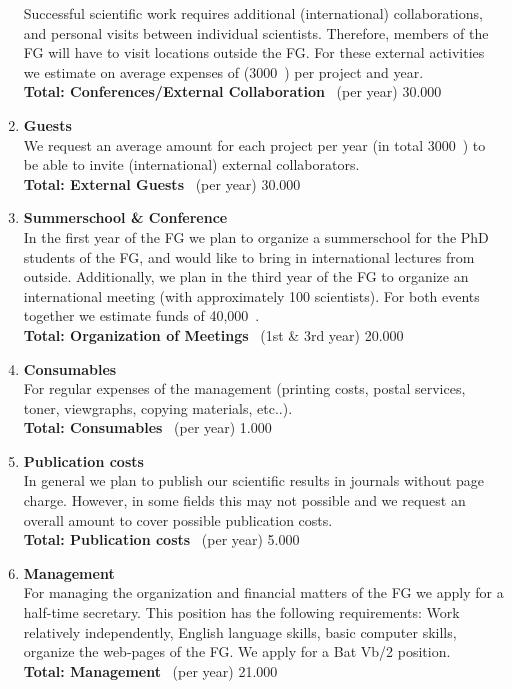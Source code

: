 \begin{enumerate}
Successful scientific work requires additional (international) collaborations, and
personal visits between individual scientists.
Therefore, members of the FG will have to visit locations outside the FG. 
For these external activities we estimate on average expenses of (3000~\EUR)
per project and year.
\\[0.2cm]
 {\bf Total: Conferences/External Collaboration} \, (per year)    \hfill 30.000~\EUR
\\[0.2cm]
%
\item {\bf Guests}\\
We request an average amount for each project per year (in total 3000~\EUR) to
be able to invite (international) external collaborators.
\\[0.2cm]
 {\bf Total: External Guests} \,  (per year)              \hfill 30.000~\EUR
\\[0.2cm]
%
%
\item {\bf Summerschool \& Conference}\\
In the first year of the FG we plan to organize a summerschool for
the PhD students of the FG, and would like to bring in international lectures
from outside.
Additionally, we plan in the third year of the FG to organize an international
meeting (with approximately 100 scientists).
For both events together we estimate funds of 40,000~\EUR. 
\\[0.2cm]
 {\bf Total: Organization of Meetings} \,  (1st \& 3rd year)    \hfill 20.000~\EUR
\\[0.2cm]
%
\item {\bf Consumables}\\
For regular expenses of the management (printing costs, postal services, toner,
viewgraphs, copying materials, etc..).
\\[0.2cm]
 {\bf Total: Consumables} \,  (per year)                 \hfill 1.000~\EUR
\\[0.2cm]
\newpage
\item {\bf Publication costs}\\
In general we plan to publish our scientific results in journals without
page charge. However, in some fields this may not possible and we request 
an overall amount to cover possible publication costs.
\\[0.2cm]
 {\bf Total: Publication costs} \, (per year)              \hfill 5.000~\EUR
\\[0.2cm]
\item {\bf Management}\\
For managing the organization and financial matters of the FG we apply for
a half-time secretary. This position has the following requirements:
Work relatively independently, English language skills, basic computer skills, 
organize the web-pages of the FG.
We apply for a Bat Vb/2 position.
\\[0.2cm]
 {\bf Total: Management} \, (per year)           \hfill 21.000~\EUR
\\[0.2cm]

\end{enumerate}
 
